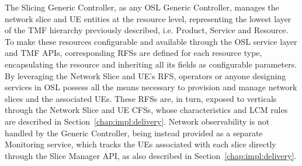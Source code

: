The Slicing Generic Controller, as any \acs{OSL} Generic Controller, manages the network slice and \acs{UE} entities at the resource level, representing the lowest layer of the \acs{TMF} hierarchy previously described, i.e. Product, Service and Resource. To make these resources configurable and available through the \acs{OSL} service layer and \acs{TMF} \acsp{API}, corresponding \acsp{RFS} are defined for each resource type, encapsulating the resource and inheriting all its fields as configurable parameters. By leveraging the Network Slice and \acs{UE}'s \acs{RFS}, operators or anyone designing services in \acs{OSL} possess all the means necessary to provision and manage network slices and the associated \acsp{UE}. These \acsp{RFS} are, in turn, exposed to verticals through the Network Slice and \acs{UE} \acsp{CFS}, whose characteristics and \acs{LCM} rules are described in Section~\ref{chap:impl:delivery}. Network observability is not handled by the Generic Controller, being instead provided as a separate Monitoring service, which tracks the \acsp{UE} associated with each slice directly through the Slice Manager \acs{API}, as also described in Section~\ref{chap:impl:delivery}.
